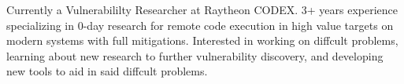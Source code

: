 

\begin{cvparagraph}

Currently a Vulnerabililty Researcher at Raytheon CODEX. 3+ years experience specializing in 0-day research for 
remote code execution in high value targets on modern systems with full mitigations. Interested in working on 
diffcult problems, learning about new research to further vulnerability discovery, and developing
new tools to aid in said diffcult problems.
\end{cvparagraph}
